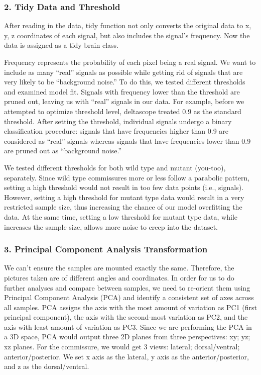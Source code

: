 \documentclass[10pt,letterpaper]{article}
\begin{document}
\hypertarget{tidy-data-and-threshold}{%
\subsubsection{2. Tidy Data and
Threshold}\label{tidy-data-and-threshold}}

After reading in the data, tidy function not only converts the original
data to x, y, z coordinates of each signal, but also includes the
signal's frequency. Now the data is assigned as a tidy brain class.

Frequency represents the probability of each pixel being a real signal.
We want to include as many ``real'' signals as possible while getting
rid of signals that are very likely to be ``background noise.'' To do
this, we tested different thresholds and examined model fit. Signals
with frequency lower than the threshold are pruned out, leaving us with
``real'' signals in our data. For example, before we attempted to
optimize threshold level, deltascope treated 0.9 as the standard
threshold. After setting the threshold, individual signals undergo a
binary classification procedure: signals that have frequencies higher
than 0.9 are considered as ``real'' signals whereas signals that have
frequencies lower than 0.9 are pruned out as ``background noise.''

We tested different thresholds for both wild type and mutant (you-too),
separately. Since wild type commissures more or less follow a parabolic
pattern, setting a high threshold would not result in too few data
points (i.e., signals). However, setting a high threshold for mutant
type data would result in a very restricted sample size, thus increasing
the chance of our model overfitting the data. At the same time, setting
a low threshold for mutant type data, while increases the sample size,
allows more noise to creep into the dataset.

\hypertarget{principal-component-analysis-transformation}{%
\subsubsection{3. Principal Component Analysis
Transformation}\label{principal-component-analysis-transformation}}

We can't ensure the samples are mounted exactly the same. Therefore, the
pictures taken are of different angles and coordinates. In order for us
to do further analyses and compare between samples, we need to re-orient
them using Principal Component Analysis (PCA) and identify a consistent
set of axes across all samples. PCA assigns the axis with the most
amount of variation as PC1 (first principal component), the axis with
the second-most variation as PC2, and the axis with least amount of
variation as PC3. Since we are performing the PCA in a 3D space, PCA
would output three 2D planes from three perspectives: xy; yz; xz planes.
For the commissure, we would get 3 views: lateral; dorsal/ventral;
anterior/posterior. We set x axis as the lateral, y axis as the
anterior/posterior, and z as the dorsal/ventral.
\end{document}
